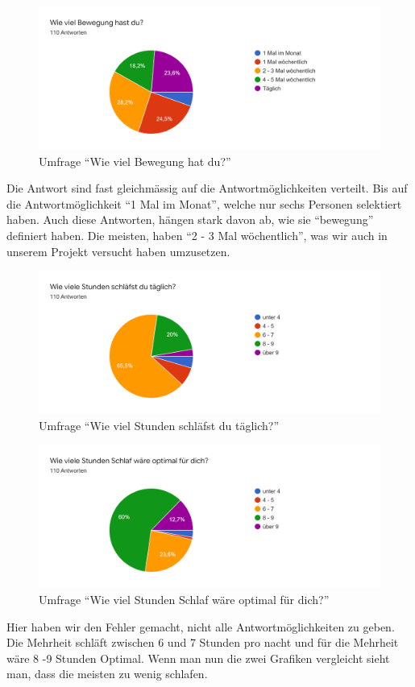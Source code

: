 \begin{figure}[H]
  \centering
  \includegraphics[width=0.7\linewidth]{./images/umfrage_d.png}
  \caption{Umfrage “Wie viel Bewegung hat du?”}
  \label{fig:umfrage_d}
\end{figure}
Die Antwort sind fast gleichmässig auf die Antwortmöglichkeiten verteilt. Bis auf die Antwortmöglichkeit “1 Mal im Monat”, welche nur sechs Personen selektiert haben. Auch diese Antworten, hängen stark davon ab, wie sie “bewegung” definiert haben. Die meisten, haben “2 - 3 Mal wöchentlich”, was wir auch in unserem Projekt versucht haben umzusetzen.
\begin{figure}[H]
  \centering
  \includegraphics[width=0.7\linewidth]{./images/umfrage_e.png}
  \caption{Umfrage “Wie viel Stunden schläfst du täglich?”}
  \label{fig:umfrage_e}
\end{figure}
\begin{figure}[H]
  \centering
  \includegraphics[width=0.7\linewidth]{./images/umfrage_f.png}
  \caption{Umfrage “Wie viel Stunden Schlaf wäre optimal für dich?”}
  \label{fig:umfrage_f}
\end{figure}
Hier haben wir den Fehler gemacht, nicht alle Antwortmöglichkeiten zu geben.
\newline
Die Mehrheit schläft zwischen 6 und 7 Stunden pro nacht und für die Mehrheit wäre 8 -9 Stunden Optimal. Wenn man nun die zwei Grafiken vergleicht sieht man, dass die meisten zu wenig schlafen.
